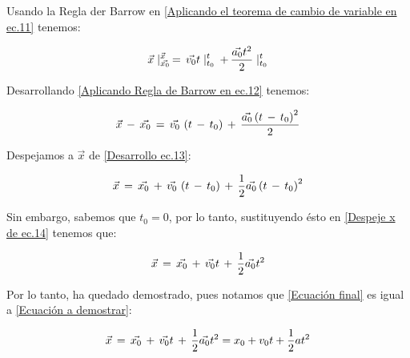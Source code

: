 \documentclass[letterpaper, 12pt]{article}
\begin{document}
\begin{enumerate}
    Usando la Regla der Barrow en \ref{Aplicando el teorema de cambio de variable en ec.11} tenemos: 
    
    \begin{equation}
        \label{Aplicando Regla de Barrow en ec.12}
        \vec{x}\mid_{\vec{x_{0}}}^{\vec{x}} \thinspace = \thinspace \vec{v_{0}}t\mid_{t_{0}}^{t} \thinspace + \thinspace \frac{\vec{a_{0}}t^2}{2}\mid_{t_{0}}^{t}
    \end{equation}
    
    Desarrollando \ref{Aplicando Regla de Barrow en ec.12} tenemos: 
     
    \begin{equation}
        \label{Desarrollo ec.13}
        \vec{x} \thinspace - \thinspace \vec{x_{0}} \thinspace = \thinspace \vec{v_{0}}\thinspace \left( t \thinspace - \thinspace t_{0}\right) \thinspace + \thinspace \frac{\vec{a_{0}}\left(t \thinspace - \thinspace t_{0}\right)^2}{2}
    \end{equation}
     
    Despejamos a $\vec{x}$ de \ref{Desarrollo ec.13}:
     
    \begin{equation}
        \label{Despeje x de ec.14}
        \vec{x} \thinspace  = \thinspace \vec{x_{0}} \thinspace + \thinspace \vec{v_{0}}\thinspace \left( t \thinspace - \thinspace t_{0}\right) \thinspace + \thinspace \frac{1}{2}\vec{a_{0}}\left(t \thinspace - \thinspace t_{0}\right)^2
    \end{equation}
     
    Sin embargo, sabemos que $t_{0}=0$, por lo tanto, sustituyendo ésto en \ref{Despeje x de ec.14} tenemos que:
     
    \begin{equation}
        \label{Ecuación final}
        \vec{x} \thinspace  = \thinspace \vec{x_{0}} \thinspace + \thinspace \vec{v_{0}} t  \thinspace + \thinspace \frac{1}{2}\vec{a_{0}} t^2
    \end{equation}
     
    Por lo tanto, ha quedado demostrado, pues notamos que \ref{Ecuación final}  es igual a \ref{Ecuación a demostrar}: 
     
    \begin{equation}
        \label{Demostración}
        \vec{x} \thinspace  = \thinspace \vec{x_{0}} \thinspace + \thinspace \vec{v_{0}} t  \thinspace + \thinspace \frac{1}{2}\vec{a_{0}} t^2 = x_{0} + v_{0}t + \frac{1}{2} at^{2}
    \end{equation}
     

\end{enumerate}
\end{document}
